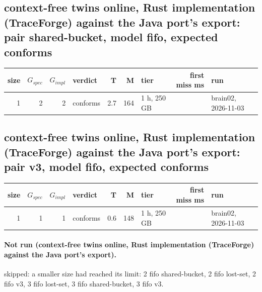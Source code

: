 \documentclass[10pt]{article}
\begin{document}
\subsection*{context-free twins online, Rust implementation (TraceForge) against the Java port's export: pair \textsf{shared-bucket}, model fifo, expected conforms}
\begin{longtable}{@{}rrrlrrlrl@{}}
\toprule
size & $G_{\mathit{spec}}$ & $G_{\mathit{impl}}$ & verdict & T & M & tier & first miss ms & run \\
\midrule
\endhead
\color{red} 1 & 2 & 2 & conforms & 2.7 & 164 & 1 h, 250 GB &  & brain02, 2026-11-03 \\
\bottomrule
\end{longtable}
\subsection*{context-free twins online, Rust implementation (TraceForge) against the Java port's export: pair \textsf{v3}, model fifo, expected conforms}
\begin{longtable}{@{}rrrlrrlrl@{}}
\toprule
size & $G_{\mathit{spec}}$ & $G_{\mathit{impl}}$ & verdict & T & M & tier & first miss ms & run \\
\midrule
\endhead
\color{red} 1 & 1 & 1 & conforms & 0.6 & 148 & 1 h, 250 GB &  & brain02, 2026-11-03 \\
\bottomrule
\end{longtable}
\paragraph{Not run (context-free twins online, Rust implementation (TraceForge) against the Java port's export).}
skipped: a smaller size had reached its limit: 2 fifo shared-bucket, 2 fifo lost-set, 2 fifo v3, 3 fifo lost-set, 3 fifo shared-bucket, 3 fifo v3.\par
\end{document}
